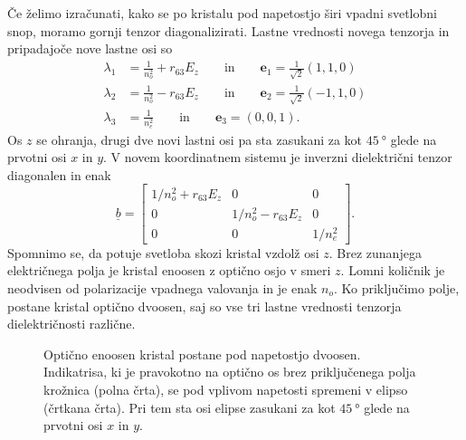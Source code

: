 Če želimo izračunati, kako se po kristalu pod napetostjo širi vpadni svetlobni
snop, moramo gornji tenzor diagonalizirati. Lastne vrednosti novega tenzorja
in pripadajoče nove lastne osi so
\begin{align}
\lambda_1 &= \frac{1}{n_o^2}+ r_{63}E_z \qquad \mathrm{in} \qquad \mathbf{e}_1 = \frac{1}{\sqrt{2}}(1,1,0)\\
\lambda_2 &= \frac{1}{n_o^2}- r_{63}E_z \qquad \mathrm{in} \qquad \mathbf{e}_2 = \frac{1}{\sqrt{2}}(-1,1,0)\\
\lambda_3 &= \frac{1}{n_e^2} \qquad \mathrm{in} \qquad \mathbf{e}_3 = (0,0,1).
\end{align}
Os $z$ se ohranja, drugi dve novi lastni osi pa sta zasukani za kot $45~\si{\degree}$ 
glede na prvotni osi $x$ in $y$.
V novem koordinatnem sistemu je inverzni dielektrični tenzor diagonalen in enak
\begin{equation}
\underline{b} = 
\left[\begin{array}{ccc}
1/n_o^2 + r_{63}E_z& 0& 0\\
0 & 1/n_o^2 - r_{63}E_z& 0\\
0 & 0& 1/n_e^2
\end{array}\right].
\end{equation}
Spomnimo se, da potuje svetloba skozi kristal vzdolž osi $z$. Brez zunanjega električnega
polja je kristal enoosen z optično osjo v smeri $z$. 
Lomni količnik je neodvisen od
polarizacije vpadnega valovanja in je enak $n_o$. Ko priključimo polje, postane kristal
optično dvoosen, saj so vse tri lastne vrednosti tenzorja dielektričnosti različne. 
\begin{figure}[h]
\centering
\def\svgwidth{60truemm} 

\caption{Optično enoosen kristal postane pod napetostjo dvoosen. Indikatrisa, ki je pravokotno
na optično os brez priključenega polja krožnica (polna črta), se pod vplivom 
napetosti spremeni v elipso (črtkana črta). Pri tem sta osi elipse zasukani za kot 
$45~\si{\degree}$ glede na prvotni osi $x$ in $y$.}
\label{fig:amn}
\end{figure}

